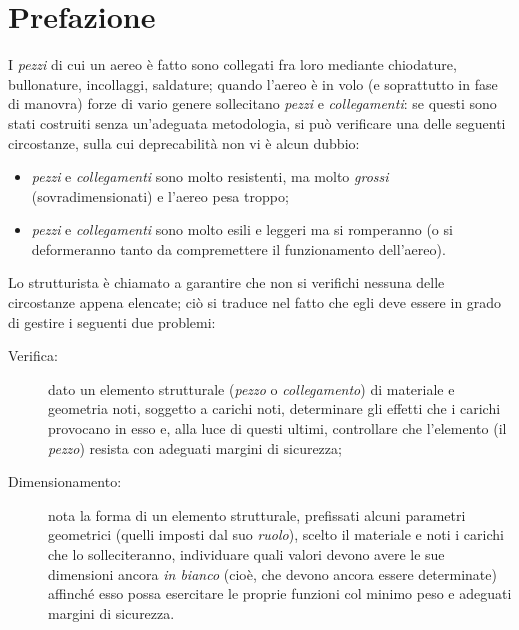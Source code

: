 \pagestyle{plain}
\part*{Prefazione}
I \emph{pezzi} di cui un aereo è fatto sono collegati fra loro mediante chiodature, bullonature, incollaggi, saldature; quando l'aereo è in volo (e soprattutto in fase di manovra) forze di vario genere sollecitano \emph{pezzi} e \emph{collegamenti}: se questi sono stati costruiti senza un'adeguata metodologia, si può verificare una delle seguenti circostanze, sulla cui deprecabilità non vi è alcun dubbio: 
\begin{itemize}
\item \emph{pezzi} e \emph{collegamenti} sono molto resistenti, ma molto \emph{grossi} (sovradimensionati) e l'aereo pesa troppo;
\item \emph{pezzi} e \emph{collegamenti} sono molto esili e leggeri ma si romperanno (o si deformeranno tanto da compremettere il funzionamento dell'aereo).
\end{itemize}
Lo strutturista è chiamato a garantire che non si verifichi nessuna delle circostanze appena elencate; ciò si traduce nel fatto che egli deve essere in grado di gestire i seguenti due problemi:
\begin{description}
\item[Verifica:] dato un elemento strutturale (\emph{pezzo} o \emph{collegamento}) di materiale e geometria noti, soggetto a carichi noti, determinare gli effetti che i carichi provocano in esso e, alla luce di questi ultimi, controllare che l'elemento (il \emph{pezzo}) resista con adeguati margini di sicurezza;
\item[Dimensionamento:] nota la forma di un elemento strutturale, prefissati alcuni parametri geometrici (quelli imposti dal suo \emph{ruolo}), scelto il materiale e noti i carichi che lo solleciteranno, individuare quali valori devono avere le sue dimensioni ancora \emph{in bianco} (cioè, che devono ancora essere determinate) affinché esso possa esercitare le proprie funzioni col minimo peso e adeguati margini di sicurezza.
\end{description}
